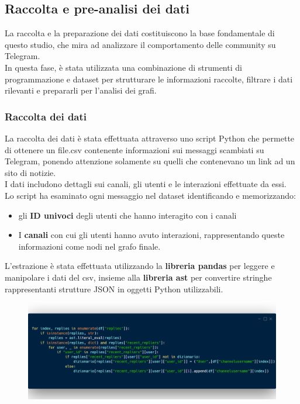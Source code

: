 \documentclass[12pt]{article}
\begin{document}
	\subsection{Raccolta e pre-analisi dei dati}
	La raccolta e la preparazione dei dati costituiscono la base fondamentale di questo studio, che mira ad analizzare il comportamento delle community su Telegram.\\
	In questa fase, è stata utilizzata una combinazione di strumenti di programmazione e dataset per strutturare le informazioni raccolte, filtrare i dati rilevanti e prepararli per l'analisi dei grafi.
	\subsubsection{Raccolta dei dati}
	La raccolta dei dati è stata effettuata attraverso uno script Python che permette di ottenere un file.csv contenente informazioni sui messaggi scambiati su Telegram, ponendo attenzione solamente su quelli che contenevano un link ad un sito di notizie.\\
	I dati includono dettagli sui canali, gli utenti e le interazioni effettuate da essi.\\
	Lo script ha esaminato ogni messaggio nel dataset identificando e memorizzando:
	\begin{itemize}[label=] 
		\item gli \textbf{ID univoci} degli utenti che hanno interagito con i canali
		\item I \textbf{canali} con cui gli utenti hanno avuto interazioni, rappresentando queste informazioni come nodi nel grafo finale.
	\end{itemize}
	L'estrazione è stata effettuata utilizzando la \textbf{libreria pandas} per leggere e manipolare i dati del csv, insieme alla \textbf{libreria ast} per convertire stringhe rappresentanti strutture JSON in oggetti Python utilizzabili.
	\begin{figure}[H]
		\centering
		\includegraphics[width=1.1\textwidth]{immagini/code1}
	\end{figure}
\end{document}
